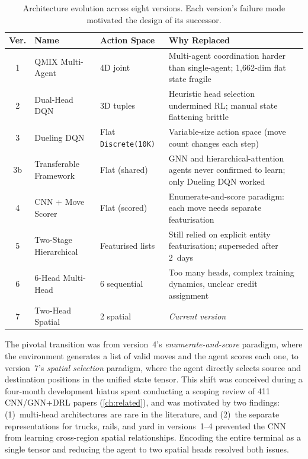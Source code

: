 \begin{table}[ht]
\centering
\caption{Architecture evolution across eight versions. Each version's failure mode motivated the design of its successor.}
\label{tab:disc:arch_evolution}
\small
\begin{tabular}{@{} c l l p{5.5cm} @{}}
\toprule
\textbf{Ver.} & \textbf{Name} & \textbf{Action Space} & \textbf{Why Replaced} \\
\midrule
1 & QMIX Multi-Agent & 4D joint & Multi-agent coordination harder than single-agent; 1{,}662-dim flat state fragile \\
2 & Dual-Head DQN & 3D tuples & Heuristic head selection undermined RL; manual state flattening brittle \\
3 & Dueling DQN & Flat \texttt{Discrete(10K)} & Variable-size action space (move count changes each step) \\
3b & Transferable Framework & Flat (shared) & GNN and hierarchical-attention agents never confirmed to learn; only Dueling DQN worked \\
4 & CNN + Move Scorer & Flat (scored) & Enumerate-and-score paradigm: each move needs separate featurisation \\
5 & Two-Stage Hierarchical & Featurised lists & Still relied on explicit entity featurisation; superseded after 2~days \\
6 & 6-Head Multi-Head & 6 sequential & Too many heads, complex training dynamics, unclear credit assignment \\
7 & Two-Head Spatial & 2 spatial & \emph{Current version} \\
\bottomrule
\end{tabular}
\end{table}

The pivotal transition was from version~4's \emph{enumerate-and-score} paradigm, where the environment generates a list of valid moves and the agent scores each one, to version~7's \emph{spatial selection} paradigm, where the agent directly selects source and destination positions in the unified state tensor. This shift was conceived during a four-month development hiatus spent conducting a scoping review of 411 CNN/GNN+DRL papers (\cref{ch:related}), and was motivated by two findings: (1)~multi-head architectures are rare in the literature, and (2)~the separate representations for trucks, rails, and yard in versions~1--4 prevented the CNN from learning cross-region spatial relationships. Encoding the entire terminal as a single tensor and reducing the agent to two spatial heads resolved both issues.

